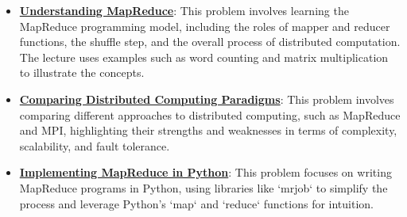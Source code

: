 \documentclass{article}%
\begin{document}
\begin{itemize}[leftmargin=*]
\item \href{https://purdue.brightspace.com/d2l/common/assets/pdfjs-d2l-dist/1.0.14-legacy/web/viewer.html?file=\%2Fcontent\%2Fenforced\%2F1095465-WL.202510.CS24200.LE1\%2F21L2-data-engineering.pdf\%3Fou\%3D1095465\&lang=en-us\&container=d2l-fileviewer-rendered-pdf\&fullscreen=d2l-fileviewer-rendered-pdf-dialog\&height=667#page=10}{\textbf{Understanding MapReduce}}: This problem involves learning the MapReduce programming model, including the roles of mapper and reducer functions, the shuffle step, and the overall process of distributed computation. The lecture uses examples such as word counting and matrix multiplication to illustrate the concepts.%
\item \href{https://purdue.brightspace.com/d2l/common/assets/pdfjs-d2l-dist/1.0.14-legacy/web/viewer.html?file=\%2Fcontent\%2Fenforced\%2F1095465-WL.202510.CS24200.LE1\%2F21L2-data-engineering.pdf\%3Fou\%3D1095465\&lang=en-us\&container=d2l-fileviewer-rendered-pdf\&fullscreen=d2l-fileviewer-rendered-pdf-dialog\&height=667#page=26}{\textbf{Comparing Distributed Computing Paradigms}}: This problem involves comparing different approaches to distributed computing, such as MapReduce and MPI, highlighting their strengths and weaknesses in terms of complexity, scalability, and fault tolerance.%
\item \href{https://purdue.brightspace.com/d2l/common/assets/pdfjs-d2l-dist/1.0.14-legacy/web/viewer.html?file=\%2Fcontent\%2Fenforced\%2F1095465-WL.202510.CS24200.LE1\%2F21L2-data-engineering.pdf\%3Fou\%3D1095465\&lang=en-us\&container=d2l-fileviewer-rendered-pdf\&fullscreen=d2l-fileviewer-rendered-pdf-dialog\&height=667#page=32}{\textbf{Implementing MapReduce in Python}}: This problem focuses on writing MapReduce programs in Python, using libraries like `mrjob` to simplify the process and leverage Python's `map` and `reduce` functions for intuition.%
\end{itemize}

%
\end{document}
